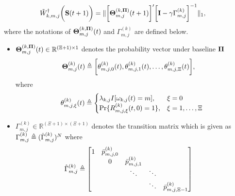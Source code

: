\begin{lemma}
    \begin{align}
        &\tilde{W}^{\dagger}_{k,m,j}\bigg(\mathbf{S}(t+1)\bigg) =
        \lVert
            \bigg[
                \boldsymbol{\Theta}^{(k, \boldsymbol{\Pi})}_{m,j}(t+1)
            \bigg]'
            \bigg[
                \mathbf{I} - \gamma \Gamma^{(k)}_{m,j}
            \bigg]^{-1}
        \|_1,
        \label{w_ap}
    \end{align}
    where the notations of $\boldsymbol{\Theta}^{(k, \boldsymbol{\Pi})}_{m,j}(t)$ and $\Gamma^{(k)}_{m,j}$ are defined below.
    \begin{itemize}
        \item $\boldsymbol{\Theta}^{(k, \boldsymbol{\Pi})}_{m,j}(t) \in \mathbb{R}^{(\Xi+1) \times 1}$ denotes the probability vector under baseline $\boldsymbol{\Pi}$
        \begin{align}
            \boldsymbol{\Theta}^{(k)}_{m,j}(t) &\triangleq
            \bigg[ \theta^{(k)}_{m,j,0}(t), \theta^{(k)}_{m,j,1}(t), \dots, \theta^{(k)}_{m,j,\Xi}(t) \bigg],
        \end{align}
        where 
        \begin{align}
            \theta^{(k)}_{m,j,\xi}(t) \triangleq 
            \begin{cases}
                \lambda_{k,j} I[\omega_{k,j}(t)=m], & \xi=0
                \\
                \Pr\{R^{(k)}_{m,j,\xi}(t,0) = 1\}, & \xi=1,\dots,\Xi
            \end{cases}
        \end{align}
        \item $\Gamma^{(k)}_{m,j} \in \mathbb{R}^{(\Xi+1) \times (\Xi+1)}$ denotes the transition matrix which is given as $\Gamma^{(k)}_{m,j} \triangleq (\hat{\Gamma}^{(k)}_{m,j})^N$ where
        \begin{align}
            \hat{\Gamma}^{(k)}_{m,j} &\triangleq
            \begin{bmatrix}
                1 & \bar{p}^{(k)}_{m,j,0} &                       &        &                           \\
                  & 0                     & \bar{p}^{(k)}_{m,j,1} &        &                           \\
                  &                       & \ddots                & \ddots &                           \\
                  &                       &                       & \ddots & \bar{p}^{(k)}_{m,j,\Xi-1} \\

\end{bmatrix}
\end{align}
\end{itemize}
\end{lemma}

